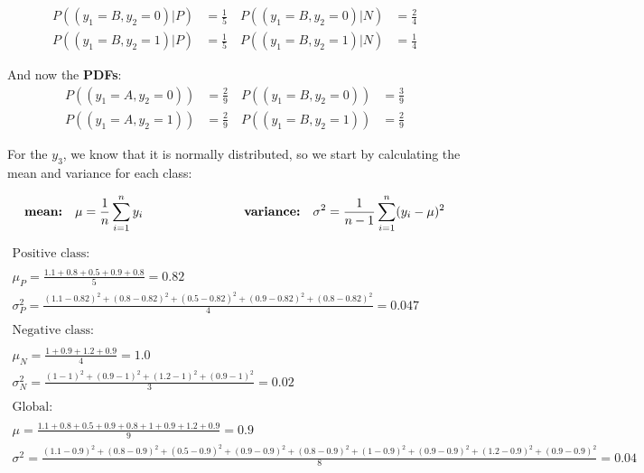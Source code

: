 \documentclass[12pt]{article}
\begin{document}
\begin{enumerate}[leftmargin=\labelsep]
    \begin{equation*}
        \begin{aligned}
        P((y_1 = B, y_2 = 0)|P) &= \frac{1}{5} \quad P((y_1 = B, y_2 = 0)|N) &= \frac{2}{4}
        \\
        P((y_1 = B, y_2 = 1)|P) &= \frac{1}{5} \quad P((y_1 = B, y_2 = 1)|N) &= \frac{1}{4} 
        \end{aligned}
    \end{equation*}

    \vspace{10pt}
    And now the \textbf{PDFs}:
    \begin{equation*}
        \begin{aligned}
        P((y_1 = A, y_2 = 0)) &= \frac{2}{9} \quad P((y_1 = B, y_2 = 0)) &= \frac{3}{9}
        \\
        P((y_1 = A, y_2 = 1)) &= \frac{2}{9} \quad P((y_1 = B, y_2 = 1)) &= \frac{2}{9} 
        \end{aligned}
    \end{equation*}


    For the $y_3$, we know that it is normally distributed, so we start by calculating the mean and variance for each class:

    \begin{equation*}
            \textbf{\text{mean:}} \quad \mu = \frac{1}{n} \sum_{i=1}^{n} y_i \qquad\qquad\qquad\qquad \textbf{\text{variance:}} \quad \sigma^2 = \frac{1}{n-1} \sum_{i=1}^{n} (y_i - \mu)^2
    \end{equation*}

    \vspace{10pt}
\[
\begin{array}{ll}
    \text{Positive class:} & \\
    \\
    \mu_P = \frac{1.1 + 0.8 + 0.5 + 0.9 + 0.8}{5} = 0.82 \\[10pt]
    \sigma_P^2 = \frac{(1.1 - 0.82)^2 + (0.8 - 0.82)^2 + (0.5 - 0.82)^2 + (0.9 - 0.82)^2 + (0.8 - 0.82)^2}{4} = 0.047 \\[10pt]
    \\
    \text{Negative class:} & \\
    \\
    \mu_N = \frac{1 + 0.9 + 1.2 + 0.9}{4} = 1.0 \\[10pt]
    \sigma_N^2 = \frac{(1 - 1)^2 + (0.9 - 1)^2 + (1.2 - 1)^2 + (0.9 - 1)^2}{3} = 0.02 \\[10pt]
    \\
    \text{Global:} & \\
    \\
    \mu = \frac{1.1 + 0.8 + 0.5 + 0.9 + 0.8 + 1 + 0.9 + 1.2 + 0.9}{9} = 0.9 \\[10pt]
    \sigma^2 = \frac{(1.1 - 0.9)^2 + (0.8 - 0.9)^2 + (0.5 - 0.9)^2 + (0.9 - 0.9)^2 + (0.8 - 0.9)^2 + (1 - 0.9)^2 + (0.9 - 0.9)^2 + (1.2 - 0.9)^2 + (0.9 - 0.9)^2}{8} = 0.04
\end{array}
\]



\end{enumerate}
\end{document}
